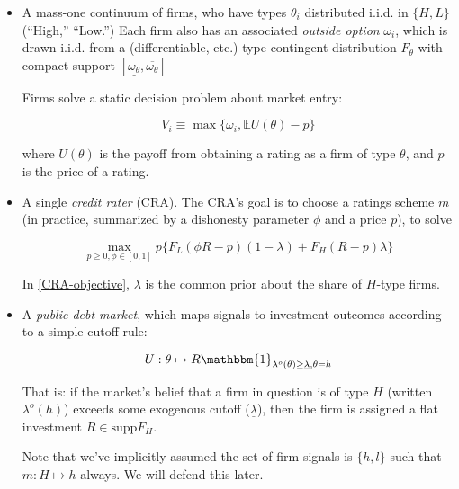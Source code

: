 \documentclass{article}
\theoremstyle{definition}
\begin{document}
\begin{itemize}
    \item A mass-one continuum of firms, who have types $\theta_i$ distributed i.i.d. in $\{H, L\}$ (``High,'' ``Low.'') Each firm also has an associated \emph{outside option} $\omega_i$, which is drawn i.i.d. from a (differentiable, etc.) type-contingent distribution $F_\theta$ with compact support $[\underline{\omega_\theta}, \overline{\omega_\theta}]$
    
    Firms solve a static decision problem about market entry: 

    \begin{equation}
        V_i \equiv \max \{\omega_i, \mathbb{E} U(\theta) - p \}
        \label{firm-objective}
    \end{equation}

    where $U(\theta)$ is the payoff from obtaining a rating as a firm of type $\theta$, and $p$ is the price of a rating.
    
    \item A single \emph{credit rater} (CRA). The CRA's goal is to choose a ratings scheme $m$ (in practice, summarized by a dishonesty parameter $\phi$ and a price $p$), to solve 
    
    \begin{equation}
        \max\limits_{p \geq 0, \phi \in [0, 1]} p \{F_L(\phi R - p)(1 - \lambda) + F_H(R - p)\lambda\}
        \label{CRA-objective}
    \end{equation}

    In \eqref{CRA-objective}, $\lambda$ is the common prior about the share of $H$-type firms.

    \item A \emph{public debt market}, which maps signals to investment outcomes according to a simple cutoff rule: 
    
    \begin{equation}
        \label{market-objective}
        U: \theta \mapsto R \mathbbm{1}_{\lambda^o(\theta) \geq \underline{\lambda}, \theta = h}
    \end{equation}

    That is: if the market's belief that a firm in question is of type $H$ (written $\lambda^o(h)$) exceeds some exogenous cutoff ($\underline{\lambda}$), then the firm is assigned a flat investment $R \in \text{supp}F_H$.  

    Note that we've implicitly assumed the set of firm signals is $\{h, l\}$ such that $m: H \mapsto h$ always. We will defend this later. 
\end{itemize}
\end{document}
